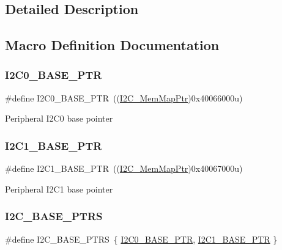 \subsection{Detailed Description}


\subsection{Macro Definition Documentation}
\mbox{\label{group___i2_c___peripheral_ga6db92fda81fa3b6a1c8c6a85e66d51a0}} 
\subsubsection{\texorpdfstring{I2\+C0\+\_\+\+B\+A\+S\+E\+\_\+\+P\+TR}{I2C0\_BASE\_PTR}}
{\footnotesize\ttfamily \#define I2\+C0\+\_\+\+B\+A\+S\+E\+\_\+\+P\+TR~((\hyperlink{group___i2_c___peripheral_ga9902bc02a12982d0c37ec011b4dd89f0}{I2\+C\+\_\+\+Mem\+Map\+Ptr})0x40066000u)}

Peripheral I2\+C0 base pointer \mbox{\label{group___i2_c___peripheral_gae13da5d584f2a4e2379db927a3f18772}} 
\subsubsection{\texorpdfstring{I2\+C1\+\_\+\+B\+A\+S\+E\+\_\+\+P\+TR}{I2C1\_BASE\_PTR}}
{\footnotesize\ttfamily \#define I2\+C1\+\_\+\+B\+A\+S\+E\+\_\+\+P\+TR~((\hyperlink{group___i2_c___peripheral_ga9902bc02a12982d0c37ec011b4dd89f0}{I2\+C\+\_\+\+Mem\+Map\+Ptr})0x40067000u)}

Peripheral I2\+C1 base pointer \mbox{\label{group___i2_c___peripheral_gaee17f364d6d1712b62774e6c33dea554}} 
\subsubsection{\texorpdfstring{I2\+C\+\_\+\+B\+A\+S\+E\+\_\+\+P\+T\+RS}{I2C\_BASE\_PTRS}}
{\footnotesize\ttfamily \#define I2\+C\+\_\+\+B\+A\+S\+E\+\_\+\+P\+T\+RS~\{ \hyperlink{group___i2_c___peripheral_ga6db92fda81fa3b6a1c8c6a85e66d51a0}{I2\+C0\+\_\+\+B\+A\+S\+E\+\_\+\+P\+TR}, \hyperlink{group___i2_c___peripheral_gae13da5d584f2a4e2379db927a3f18772}{I2\+C1\+\_\+\+B\+A\+S\+E\+\_\+\+P\+TR} \}}

